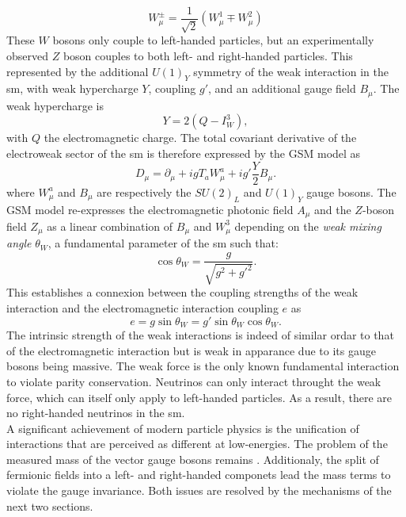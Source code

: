 \begin{equation}
    W_{\mu}^{\pm} = \frac{1}{\sqrt{2}} \left(W_{\mu}^{1} \mp W_{\mu}^{2} \right)
\end{equation}
These $W$ bosons only couple to left-handed particles, but an experimentally observed $Z$ boson couples to both left- and right-handed particles. This represented by the additional $U(1)_Y$ symmetry of the weak interaction in the \gls{sm}, with weak hypercharge $Y$, coupling $g'$, and an additional gauge field $B_{\mu}$. The weak hypercharge is \[Y = 2 (Q - I_W^3),\] with $Q$ the electromagnetic charge. The total covariant derivative of the electroweak sector of the \gls{sm} is therefore expressed by the GSM model as 
\begin{equation}\label{eq-GaugeEW}
    D_{\mu}  = \partial_{\mu} + ig T_a W_{\mu}^a + ig' \frac{Y}{2} B_{\mu}. %
\end{equation}
where $W_{\mu}^a$ and $B_{\mu}$ are respectively the $SU(2)_L$ and $U(1)_Y$ gauge bosons. The GSM model re-expresses the electromagnetic photonic field $A_\mu$ and the $Z$-boson field $Z_{\mu}$ as a linear combination of $B_{\mu}$ and $W_{\mu}^3$ depending on the \textit{weak mixing angle} $\theta_W$, a fundamental parameter of the \gls{sm} such that:
\begin{equation}\label{eq-weakmixangle}
    \cos\theta_W = \frac{g}{\sqrt{g^2 +g'^2}}.
\end{equation}
This establishes a connexion between the coupling strengths of the weak interaction and the electromagnetic interaction coupling $e$ as \[e = g \sin \theta_W = g' \sin\theta_W \cos\theta_W.\] The intrinsic strength of the weak interactions is indeed of similar ordar to that of the electromagnetic interaction but is weak in apparance due to its gauge bosons being massive. The weak force is the only known fundamental interaction to violate parity conservation. Neutrinos can only interact throught the weak force, which can itself only apply to left-handed particles. As a result, there are no right-handed neutrinos in the \gls{sm}. \\

A significant achievement of modern particle physics is the unification of interactions that are perceived as different at low-energies. The problem of the measured mass of the vector gauge bosons remains . Additionaly, the split of fermionic fields into a left- and right-handed componets lead the mass terms to violate the gauge invariance. Both issues are resolved by the mechanisms of the next two sections.

